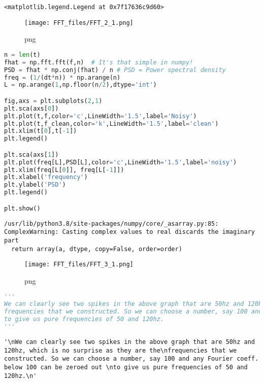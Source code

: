 \documentclass{article}
\begin{document}
\begin{lstlisting}
<matplotlib.legend.Legend at 0x7f17636c9d60>
\end{lstlisting}

\begin{figure}
\centering
\texttt{[image: FFT\_files/FFT\_2\_1.png]}
\caption{png}
\end{figure}

\begin{lstlisting}[language=Python]
n = len(t)
fhat = np.fft.fft(f,n)  # It's that simple in numpy!
PSD = fhat * np.conj(fhat) / n # PSD = Power spectral density
freq = (1/(dt*n)) * np.arange(n)
L = np.arange(1,np.floor(n/2),dtype='int')

fig,axs = plt.subplots(2,1)
plt.sca(axs[0])
plt.plot(t,f,color='c',LineWidth='1.5',label='Noisy')
plt.plot(t,f_clean,color='k',LineWidth='1.5',label='clean')
plt.xlim(t[0],t[-1])
plt.legend()

plt.sca(axs[1])
plt.plot(freq[L],PSD[L],color='c',LineWidth='1.5',label='noisy')
plt.xlim(freq[L[0]], freq[L[-1]])
plt.xlabel('frequency')
plt.ylabel('PSD')
plt.legend()

plt.show()
\end{lstlisting}

\begin{lstlisting}
/usr/lib/python3.8/site-packages/numpy/core/_asarray.py:85: ComplexWarning: Casting complex values to real discards the imaginary part
  return array(a, dtype, copy=False, order=order)
\end{lstlisting}

\begin{figure}
\centering
\texttt{[image: FFT\_files/FFT\_3\_1.png]}
\caption{png}
\end{figure}

\begin{lstlisting}[language=Python]
'''
We can clearly see two spikes in the above graph that are 50hz and 120hz, which is no surprise as they are the
frequencies that we constructed. So we can choose a number, say 100 and any Fourier coeff. below 100 can be zeroed out 
to give us pure frequencies of 50 and 120hz.
'''
\end{lstlisting}

\begin{lstlisting}
'\nWe can clearly see two spikes in the above graph that are 50hz and 120hz, which is no surprise as they are the\nfrequencies that we constructed. So we can choose a number, say 100 and any Fourier coeff. below 100 can be zeroed out \nto give us pure frequencies of 50 and 120hz.\n'
\end{lstlisting}
\end{document}
